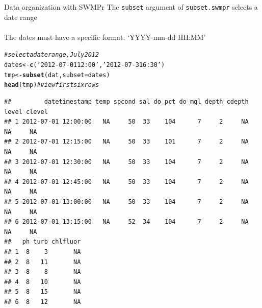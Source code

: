 \documentclass[xcolor=dvipsnames]{beamer}\usepackage[]{graphicx}\usepackage[]{color}
\makeatletter
\newcommand{\hlstr}[1]{\textcolor[rgb]{0.192,0.494,0.8}{#1}}%
\newcommand{\hlcom}[1]{\textcolor[rgb]{0.678,0.584,0.686}{\textit{#1}}}%
\newcommand{\hlstd}[1]{\textcolor[rgb]{0.345,0.345,0.345}{#1}}%
\newcommand{\hlkwb}[1]{\textcolor[rgb]{0.69,0.353,0.396}{#1}}%
\newcommand{\hlkwc}[1]{\textcolor[rgb]{0.333,0.667,0.333}{#1}}%
\newcommand{\hlkwd}[1]{\textcolor[rgb]{0.737,0.353,0.396}{\textbf{#1}}}%
\newenvironment{kframe}{%
 \def\at@end@of@kframe{}%
 \ifinner\ifhmode%
  \def\at@end@of@kframe{\end{minipage}}%
  \begin{minipage}{\columnwidth}%
 \fi\fi%
 \def\FrameCommand##1{\hskip\@totalleftmargin \hskip-\fboxsep
 \colorbox{shadecolor}{##1}\hskip-\fboxsep
     \hskip-\linewidth \hskip-\@totalleftmargin \hskip\columnwidth}%
 \MakeFramed {\advance\hsize-\width
   \@totalleftmargin\z@ \linewidth\hsize
   \@setminipage}}%
 {\par\unskip\endMakeFramed%
 \at@end@of@kframe}
\newenvironment{knitrout}{}{} %
\makeatother
\begin{document}
\begin{frame}[fragile]{Data organization with SWMPr}
The \texttt{subset} argument of \texttt{subset.swmpr} selects a date range \\~\\
The dates must have a specific format: `YYYY-mm-dd HH:MM'
\begin{knitrout}\scriptsize
{}\color{fgcolor}\begin{kframe}
\begin{alltt}
\hlcom{# select a date range, July 2012}
\hlstd{dates} \hlkwb{<-} \hlkwd{c}\hlstd{(}\hlstr{'2012-07-01 12:00'}\hlstd{,} \hlstr{'2012-07-31 6:30'}\hlstd{)}
\hlstd{tmp} \hlkwb{<-} \hlkwd{subset}\hlstd{(dat,} \hlkwc{subset} \hlstd{= dates)}
\hlkwd{head}\hlstd{(tmp)} \hlcom{# view first six rows}
\end{alltt}
\begin{verbatim}
##         datetimestamp temp spcond sal do_pct do_mgl depth cdepth level clevel
## 1 2012-07-01 12:00:00   NA     50  33    104      7     2     NA    NA     NA
## 2 2012-07-01 12:15:00   NA     50  33    101      7     2     NA    NA     NA
## 3 2012-07-01 12:30:00   NA     50  33    104      7     2     NA    NA     NA
## 4 2012-07-01 12:45:00   NA     50  33    104      7     2     NA    NA     NA
## 5 2012-07-01 13:00:00   NA     50  33    104      7     2     NA    NA     NA
## 6 2012-07-01 13:15:00   NA     52  34    104      7     2     NA    NA     NA
##   ph turb chlfluor
## 1  8    3       NA
## 2  8   11       NA
## 3  8    8       NA
## 4  8   10       NA
## 5  8   15       NA
## 6  8   12       NA
\end{verbatim}
\end{kframe}
\end{knitrout}
\end{frame}
\end{document}
